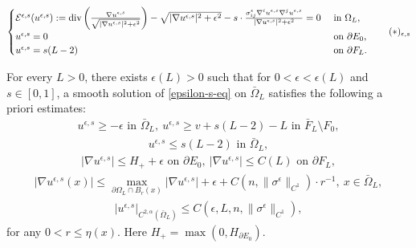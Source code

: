 \documentclass[10pt,a4paper]{amsart}
\begin{document}
\begin{align}\label{epsilon-s-eq}
	\begin{cases}
		\mathcal{E}^{\epsilon , s}(u ^{\epsilon ,s} ):= \mathrm{div}\left( \frac{\nabla u ^{\epsilon , s}}{ \sqrt{|\nabla u^{\epsilon, s }|^2 + \epsilon ^2} } \right) - \sqrt{|\nabla u^{\epsilon, s }|^2+ \epsilon ^2} - s\cdot \frac{\sigma^{\epsilon } _{ij}\nabla ^{i} u^{\epsilon, s } \nabla ^{j} u ^{\epsilon ,s}}{|\nabla u^{\epsilon,s }|^2 + \epsilon ^2} =0 &\text{ in } \Omega _{L},\\
		u ^{\epsilon , s}=0 &\text{ on } \partial E_0,\\
		u ^{\epsilon , s}= s(L-2) & \text{ on } \partial F_{L}.
	\end{cases}
	\tag*{$(*)_{\epsilon ,s}$}
\end{align}

\begin{lem}\label{appen-apriori-estimates}
	For every $L>0$, there exists $\epsilon (L)>0$ such that for $0< \epsilon < \epsilon (L)$ and $s \in [0,1]$, a smooth solution of \ref{epsilon-s-eq} on $\bar{\Omega }_{L}$ satisfies the following a priori estimates:
	\begin{align}
		u^{\epsilon ,s} \geq - \epsilon \text{ in } \bar{\Omega }_{L},\ u^{\epsilon ,s} \geq v+ s(L-2) -L \text{ in } \bar{F}_{L}\setminus F_0,
	\end{align} 
	\begin{align}
		u^{\epsilon, s } \leq s(L-2) \text{ in } \bar{\Omega }_{L},
	\end{align}
	\begin{align}
		|\nabla u^{\epsilon ,s}| \leq H_{+}  + \epsilon \text{ on } \partial E_0,\ |\nabla u^{\epsilon ,s}| \leq C(L) \text{ on } \partial F_{L},
	\end{align}
	\begin{align}
		|\nabla u^{\epsilon ,s}(x)| \leq \max_{\partial \Omega _{L} \cap B_r(x)}|\nabla u^{\epsilon ,s}| + \epsilon + C(n, \|\sigma^{\epsilon } \|_{C^1}) \cdot r ^{-1}, \ x \in \bar{\Omega }_{L},
	\end{align}
	\begin{align}
		|u^{\epsilon ,s}|_{C^{2, \alpha }(\bar{\Omega }_{L})} \leq C(\epsilon , L, n, \|\sigma ^{\epsilon }\|_{C^1}),
	\end{align}
	for any $0<r\leq \eta (x)$. Here $H_{+}= \max(0, H_{\partial E_0})$.
\end{lem}
\end{document}
